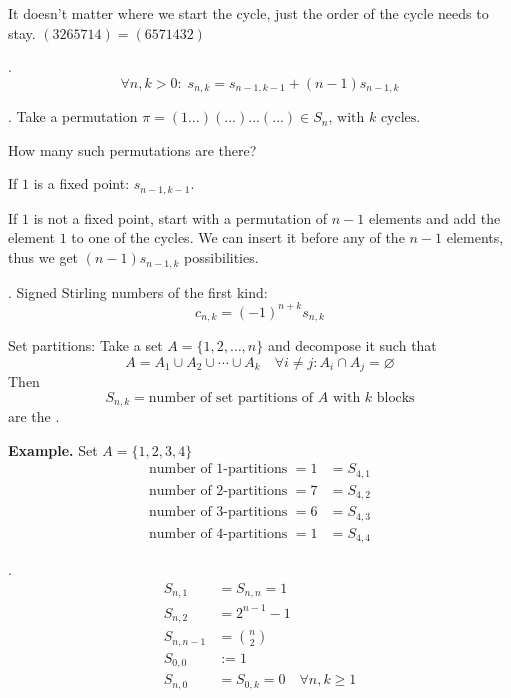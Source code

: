 It doesn't matter where we start the cycle, just the order of the cycle needs to stay. $(3 2 6 5 7 1 4) = (6 5 7 1 4 3 2)$

\Theorem.
\[
  \forall n,k > 0:\;
  s_{n,k} = s_{n-1,k-1} + (n-1)s_{n-1,k}
\]

\Proof.
Take a permutation
$\pi = (1 \ldots )(\ldots) \ldots (\ldots) \in S_n \text{, with $k$ cycles}$.

How many such permutations are there?

\begin{compactitem}
  \item If $1$ is a fixed point: $s_{n-1, k-1}$.

  \item If $1$ is not a fixed point, start with a permutation of $n-1$ elements and add the element $1$ to one of the cycles. We can insert it before any of the $n-1$ elements, thus we get
$(n-1) s_{n-1,k}$ possibilities.
\end{compactitem}

\Remark.
Signed Stirling numbers of the first kind:
\[
  c_{n,k} = (-1)^{n+k} s_{n,k}
\]

\begin{definition}
Set partitions:
Take a set $A=\{1,2, \ldots, n\}$
and decompose it such that
\[
  A = A_1 \cup A_2 \cup \cdots\cup A_k
  \quad
  \forall i\neq j: A_i \cap A_j = \varnothing
\]
Then
\[
  S_{n,k} = \text{number of set partitions of $A$ with $k$ blocks}
\]
are the .
\end{definition}

\textbf{Example.}
Set $A = \{1,2,3,4\}$
\begin{align*}
  \text{number of 1-partitions }= 1 &= S_{4,1}\\
  \text{number of 2-partitions }= 7 &= S_{4,2}\\
  \text{number of 3-partitions }= 6 &= S_{4,3}\\
  \text{number of 4-partitions }= 1 &= S_{4,4}
\end{align*}

\Remark.
\begin{align*}
  S_{n,1} &= S_{n,n} = 1 \\
  S_{n,2} &= 2^{n-1}-1 \\
  S_{n,n-1} &= {n\choose 2} \\
  S_{0,0} &:= 1 \\
  S_{n,0} &= S_{0,k} = 0
    \quad\forall n,k ≥ 1
\end{align*}

